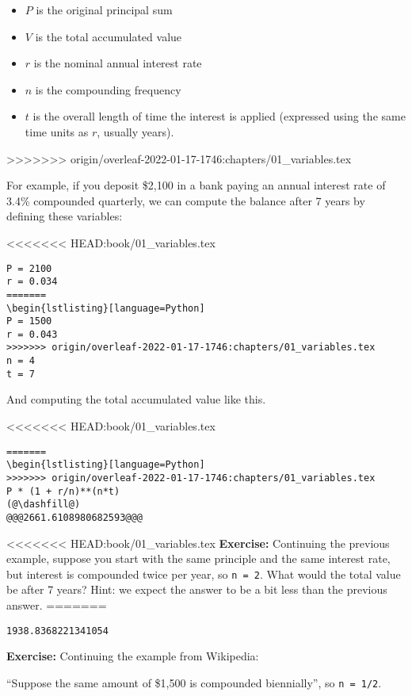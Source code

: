 \begin{itemize}
\item
  \(P\) is the original principal sum
\item
  \(V\) is the total accumulated value
\item
  \(r\) is the nominal annual interest rate
\item
  \(n\) is the compounding frequency
\item
  \(t\) is the overall length of time the interest is applied (expressed
  using the same time units as \(r\), usually years).
\end{itemize}
>>>>>>> origin/overleaf-2022-01-17-1746:chapters/01_variables.tex

For example, if you deposit \$2,100 in a bank paying an annual interest
rate of 3.4\% compounded quarterly, we can compute the balance after 7
years by defining these variables:

<<<<<<< HEAD:book/01_variables.tex
\begin{lstlisting}[]
P = 2100
r = 0.034
=======
\begin{lstlisting}[language=Python]
P = 1500
r = 0.043
>>>>>>> origin/overleaf-2022-01-17-1746:chapters/01_variables.tex
n = 4
t = 7
\end{lstlisting}

And computing the total accumulated value like this.

<<<<<<< HEAD:book/01_variables.tex
\begin{lstlisting}[]
=======
\begin{lstlisting}[language=Python]
>>>>>>> origin/overleaf-2022-01-17-1746:chapters/01_variables.tex
P * (1 + r/n)**(n*t)
(@\dashfill@)
@@@2661.6108980682593@@@
\end{lstlisting}

<<<<<<< HEAD:book/01_variables.tex
\textbf{Exercise:} Continuing the previous example, suppose you start
with the same principle and the same interest rate, but interest is
compounded twice per year, so \passthrough{\lstinline!n = 2!}. What
would the total value be after 7 years? Hint: we expect the answer to be
a bit less than the previous answer.
=======
\begin{lstlisting}[]
1938.8368221341054
\end{lstlisting}

\textbf{Exercise:} Continuing the example from Wikipedia:

``Suppose the same amount of \$1,500 is compounded biennially'', so
\passthrough{\lstinline!n = 1/2!}.

